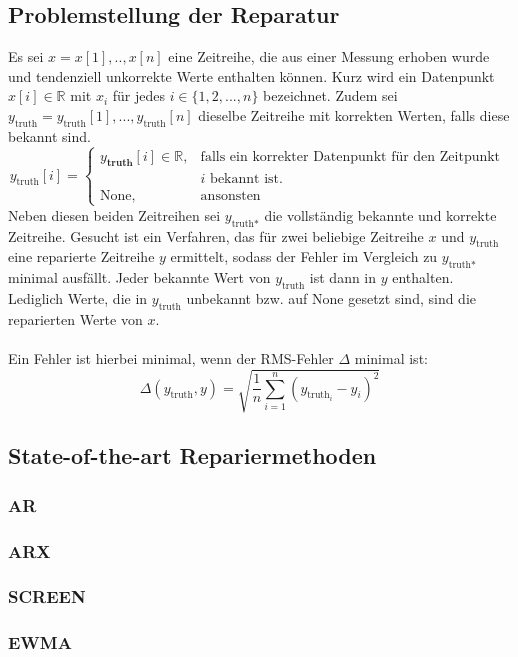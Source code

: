 \subsection{Problemstellung der Reparatur}

Es sei $x = x[1],..,x[n]$ eine Zeitreihe, die aus einer Messung erhoben wurde und tendenziell unkorrekte Werte enthalten können. Kurz wird ein Datenpunkt $x[i] \in \mathbb{R}$ mit $x_i$ für jedes $i \in \{1,2,...,n\}$ bezeichnet. Zudem sei $y_{\text{truth}} = y_{\text{truth}}[1],...,y_{\text{truth}}[n]$ dieselbe Zeitreihe mit korrekten Werten, falls diese bekannt sind.
\[
    y_{\text{truth}}[i] = \left\{
\begin{array}{ll}
y_{\textbf{truth}}[i] \in \mathbb{R},& \text{falls ein korrekter Datenpunkt für den Zeitpunkt }\\
& i \text{ bekannt ist.}\\
\text{None},& \text{ansonsten}
\end{array}
 \right.
\]
Neben diesen beiden Zeitreihen sei $y_{\text{truth*}}$ die vollständig bekannte
und korrekte Zeitreihe. Gesucht ist ein Verfahren, das für zwei beliebige
Zeitreihe $x$ und $y_{\text{truth}}$ eine reparierte Zeitreihe $y$ ermittelt,
sodass der Fehler im Vergleich zu $y_{\text{truth*}}$ minimal ausfällt. Jeder
bekannte Wert von $y_{\text{truth}}$ ist dann in $y$ enthalten. Lediglich
Werte, die in $y_{\text{truth}}$ unbekannt bzw. auf None gesetzt sind, sind die
reparierten Werte von $x$.
\\
\\
Ein Fehler ist hierbei minimal, wenn der RMS-Fehler $\Delta$ minimal ist:
\[
    \Delta\left(y_{\text{truth}}, y\right) = \sqrt{\frac{1}{n} \sum_{i=1}^n\left(y_{\text{truth}_i} - y_i\right)^2}
\]
\subsection{State-of-the-art Repariermethoden}
\subsubsection{AR}
\subsubsection{ARX}
\subsubsection{SCREEN}
\subsubsection{EWMA}

